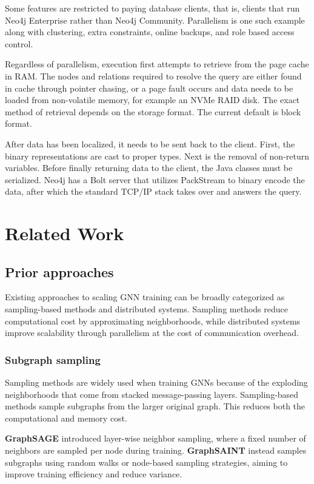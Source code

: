 \documentclass[PhD]{uclathes}
\begin{document}
Some features are restricted to paying database clients, that is, clients that
run Neo4j Enterprise rather than Neo4j Community. Parallelism is one such
example along with clustering, extra constraints, online backups, and role
based access control.

Regardless of parallelism, execution first attempts to retrieve from the page
cache in RAM. The nodes and relations required to resolve the query are either
found in cache through pointer chasing, or a page fault occurs and data needs
to be loaded from non-volatile memory, for example an NVMe RAID disk. The exact
method of retrieval depends on the storage format. The current default is block
format.

After data has been localized, it needs to be sent back to the client. First,
the binary representations are cast to proper types. Next is the removal of
non-return variables. Before finally returning data to the client, the Java
classes must be serialized. Neo4j has a Bolt server that utilizes PackStream to
binary encode the data, after which the standard TCP/IP stack takes over and
answers the query.

\chapter{Related Work}

\section{Prior approaches}
Existing approaches to scaling GNN training can be broadly categorized as
sampling-based methods and distributed systems. Sampling methods reduce
computational cost by approximating neighborhoods, while distributed systems
improve scalability through parallelism at the cost of communication overhead.

\subsection{Subgraph sampling}
Sampling methods are widely used when training GNNs because of the exploding
neighborhoods that come from stacked message-passing layers. Sampling-based
methods sample subgraphs from the larger original graph. This reduces both the
computational and memory cost.

\textbf{GraphSAGE} introduced layer-wise neighbor sampling, where a fixed
number of neighbors are sampled per node during training. \textbf{GraphSAINT}
instead samples subgraphs using random walks or node-based sampling strategies,
aiming to improve training efficiency and reduce variance.
\end{document}
